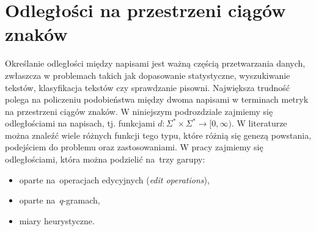 \documentclass{praca1}
\begin{document}

%




\section{Odległości na przestrzeni ciągów znaków}

Określanie odległości między napisami jest ważną częścią przetwarzania danych, zwłaszcza w problemach takich jak dopasowanie statystyczne, wyszukiwanie tekstów, klasyfikacja tekstów czy sprawdzanie pisowni. Największa trudność polega na policzeniu podobieństwa między dwoma napisami w terminach metryk na przestrzeni ciągów znaków.  W niniejszym podrozdziale zajmiemy się odległościami na napisach, tj. funkcjami $d: \Sigma^* \times \Sigma^* \rightarrow [0, \infty)$. W literaturze można znaleźć wiele różnych funkcji tego typu, które różnią się genezą powstania, podejściem do problemu oraz zastosowaniami. W pracy zajmiemy się odległościami, która można podzielić na~trzy garupy:
\begin{itemize}
\item oparte na~operacjach edycyjnych (\emph{edit operations}),
\item oparte na~$q$-gramach,
\item miary heurystyczne.
\end{itemize}
\end{document}
